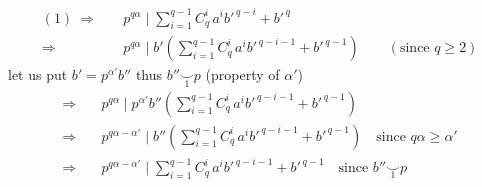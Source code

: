 \[
\begin{aligned}
(1)\ \Longrightarrow\quad&p^{q\alpha}\mid\sum_{i=1}^{q-1}C_q^i\,a^i b'^{\,q-i}+b'^{\,q}\\
\Longrightarrow\quad&p^{q\alpha}\mid b'\left(\sum_{i=1}^{q-1}C_q^i\,a^i b'^{\,q-i-1}+b'^{\,q-1}\right)\qquad(\text{since }q\geqslant2)
\end{aligned}
\]
let us put $b'=p^{\alpha'}b''$ thus $b''\mathrel{\underset{1}{\smile}}p$ (property of $\alpha'$)
\[
\begin{aligned}
\Longrightarrow\quad&p^{q\alpha}\mid p^{\alpha'}b''\left(\sum_{i=1}^{q-1}C_q^i\,a^i b'^{\,q-i-1}+b'^{\,q-1}\right)\\
\Longrightarrow\quad&p^{q\alpha-\alpha'}\mid b''\left(\sum_{i=1}^{q-1}C_q^i\,a^i b'^{\,q-i-1}+b'^{\,q-1}\right)\quad\text{since }q\alpha\geqslant\alpha'\\
\Longrightarrow\quad&p^{q\alpha-\alpha'}\mid\sum_{i=1}^{q-1}C_q^i\,a^i b'^{\,q-i-1}+b'^{\,q-1}\quad\text{since }b''\mathrel{\underset{1}{\smile}}p
\end{aligned}
\]
